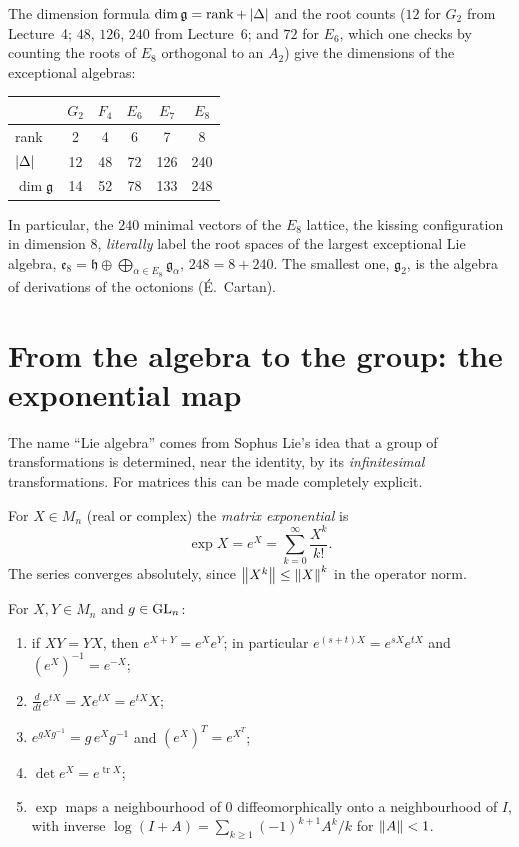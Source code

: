 The dimension formula $\dim\mathfrak g=\operatorname{rank}+\left\lvert \Delta \right\rvert$ and the root counts ($12$ for
$G_2$ from Lecture~4; $48$, $126$, $240$ from Lecture~6; and $72$ for $E_6$, which one checks by counting
the roots of $E_8$ orthogonal to an $A_2$) give the dimensions of the exceptional algebras:
\begin{center}
\renewcommand{\arraystretch}{1.2}
\begin{tabular}{lccccc}
\toprule
 & $G_2$ & $F_4$ & $E_6$ & $E_7$ & $E_8$\\
\midrule
rank & 2 & 4 & 6 & 7 & 8\\
$\left\lvert \Delta \right\rvert$ & 12 & 48 & 72 & 126 & 240\\
$\dim\mathfrak g$ & 14 & 52 & 78 & 133 & 248\\
\bottomrule
\end{tabular}
\end{center}
In particular, the $240$ minimal vectors of the $E_8$ lattice, the kissing configuration in
dimension $8$, \emph{literally} label the root spaces of the largest exceptional Lie algebra,
$\mathfrak e_8=\mathfrak h\oplus\bigoplus_{\alpha\in E_8}\mathfrak g_\alpha$, $248=8+240$. The smallest one,
$\mathfrak g_2$, is the algebra of derivations of the octonions (\'E.~Cartan).

\section{From the algebra to the group: the exponential map}
\label{LIE:sec:exp}

The name ``Lie algebra'' comes from Sophus Lie's idea that a group of transformations is determined,
near the identity, by its \emph{infinitesimal} transformations. For matrices this can be made
completely explicit.

\begin{definition}
For $X\in M_n$ (real or complex) the \emph{matrix exponential} is
\[
  \exp X=e^X=\sum_{k=0}^\infty\frac{X^k}{k!}.
\]
The series converges absolutely, since $\left\lVert X^k \right\rVert\le\left\lVert X \right\rVert^k$ in the operator norm.
\end{definition}

\begin{proposition}\label{LIE:prop:exp}
For $X,Y\in M_n$ and $g\in\mathrm{GL}_n$:
\begin{enumerate}[nosep]
\item if $XY=YX$, then $e^{X+Y}=e^Xe^Y$; in particular $e^{(s+t)X}=e^{sX}e^{tX}$ and $(e^X)^{-1}=e^{-X}$;
\item $\frac{d}{dt}e^{tX}=Xe^{tX}=e^{tX}X$;
\item $e^{gXg^{-1}}=g\,e^Xg^{-1}$ and $(e^X)^T=e^{X^T}$;
\item $\det e^X=e^{\operatorname{tr}X}$;
\item $\exp$ maps a neighbourhood of $0$ diffeomorphically onto a neighbourhood of $I$, with inverse
  $\log(I+A)=\sum_{k\ge1}(-1)^{k+1}A^k/k$ for $\left\lVert A \right\rVert<1$.
\end{enumerate}
\end{proposition}

